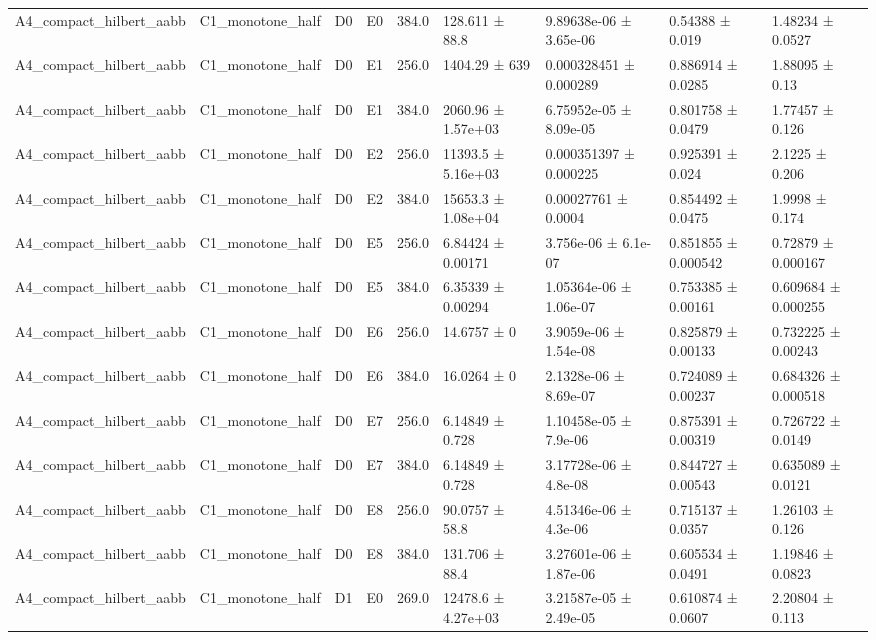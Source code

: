 \begin{table}
\begin{tabular}{lllllllll}
A4\_compact\_hilbert\_aabb & C1\_monotone\_half & D0 & E0 & 384.0 & 128.611 ± 88.8 & 9.89638e-06 ± 3.65e-06 & 0.54388 ± 0.019 & 1.48234 ± 0.0527 \\
A4\_compact\_hilbert\_aabb & C1\_monotone\_half & D0 & E1 & 256.0 & 1404.29 ± 639 & 0.000328451 ± 0.000289 & 0.886914 ± 0.0285 & 1.88095 ± 0.13 \\
A4\_compact\_hilbert\_aabb & C1\_monotone\_half & D0 & E1 & 384.0 & 2060.96 ± 1.57e+03 & 6.75952e-05 ± 8.09e-05 & 0.801758 ± 0.0479 & 1.77457 ± 0.126 \\
A4\_compact\_hilbert\_aabb & C1\_monotone\_half & D0 & E2 & 256.0 & 11393.5 ± 5.16e+03 & 0.000351397 ± 0.000225 & 0.925391 ± 0.024 & 2.1225 ± 0.206 \\
A4\_compact\_hilbert\_aabb & C1\_monotone\_half & D0 & E2 & 384.0 & 15653.3 ± 1.08e+04 & 0.00027761 ± 0.0004 & 0.854492 ± 0.0475 & 1.9998 ± 0.174 \\
A4\_compact\_hilbert\_aabb & C1\_monotone\_half & D0 & E5 & 256.0 & 6.84424 ± 0.00171 & 3.756e-06 ± 6.1e-07 & 0.851855 ± 0.000542 & 0.72879 ± 0.000167 \\
A4\_compact\_hilbert\_aabb & C1\_monotone\_half & D0 & E5 & 384.0 & 6.35339 ± 0.00294 & 1.05364e-06 ± 1.06e-07 & 0.753385 ± 0.00161 & 0.609684 ± 0.000255 \\
A4\_compact\_hilbert\_aabb & C1\_monotone\_half & D0 & E6 & 256.0 & 14.6757 ± 0 & 3.9059e-06 ± 1.54e-08 & 0.825879 ± 0.00133 & 0.732225 ± 0.00243 \\
A4\_compact\_hilbert\_aabb & C1\_monotone\_half & D0 & E6 & 384.0 & 16.0264 ± 0 & 2.1328e-06 ± 8.69e-07 & 0.724089 ± 0.00237 & 0.684326 ± 0.000518 \\
A4\_compact\_hilbert\_aabb & C1\_monotone\_half & D0 & E7 & 256.0 & 6.14849 ± 0.728 & 1.10458e-05 ± 7.9e-06 & 0.875391 ± 0.00319 & 0.726722 ± 0.0149 \\
A4\_compact\_hilbert\_aabb & C1\_monotone\_half & D0 & E7 & 384.0 & 6.14849 ± 0.728 & 3.17728e-06 ± 4.8e-08 & 0.844727 ± 0.00543 & 0.635089 ± 0.0121 \\
A4\_compact\_hilbert\_aabb & C1\_monotone\_half & D0 & E8 & 256.0 & 90.0757 ± 58.8 & 4.51346e-06 ± 4.3e-06 & 0.715137 ± 0.0357 & 1.26103 ± 0.126 \\
A4\_compact\_hilbert\_aabb & C1\_monotone\_half & D0 & E8 & 384.0 & 131.706 ± 88.4 & 3.27601e-06 ± 1.87e-06 & 0.605534 ± 0.0491 & 1.19846 ± 0.0823 \\
A4\_compact\_hilbert\_aabb & C1\_monotone\_half & D1 & E0 & 269.0 & 12478.6 ± 4.27e+03 & 3.21587e-05 ± 2.49e-05 & 0.610874 ± 0.0607 & 2.20804 ± 0.113 \\

\end{tabular}
\end{table}
